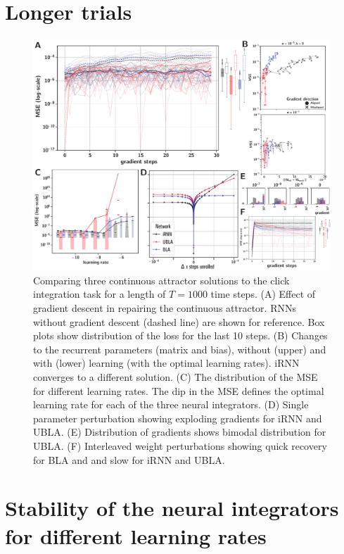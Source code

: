 \documentclass{article} %
\newcounter{ct}
\theoremstyle{definition}
\theoremstyle{remark}
\begin{document}
\section{Longer trials}
\begin{figure}[H]
  \centering
  \includegraphics[width=\textwidth]{maintenance_T1000.pdf}
  \caption{
  Comparing three continuous attractor solutions to the click integration task for a length of $T=1000$ time steps.
  (A) Effect of gradient descent in repairing the continuous attractor. RNNs without gradient descent (dashed line) are shown for reference. Box plots show distribution of the loss for the last 10 steps.
  (B) Changes to the recurrent parameters (matrix and bias), without (upper) and with (lower) learning (with the optimal learning rates). iRNN converges to a different solution.
 (C)  The distribution of the MSE for different learning rates. The dip in the MSE defines the optimal learning rate for each of the three neural integrators. 
    (D) Single parameter perturbation showing exploding gradients for iRNN and UBLA.
  (E) Distribution of gradients shows bimodal distribution for UBLA.
    (F) Interleaved weight perturbations showing quick recovery for BLA and and slow for iRNN and UBLA.
  }
  \label{fig:maintenance:long}
\end{figure}


\section{Stability of the neural integrators for different learning rates}
\end{document}
